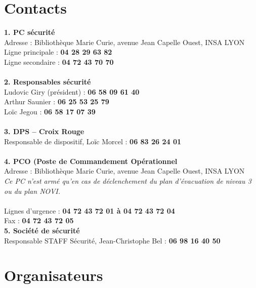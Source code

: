\documentclass[hidelinks, paper=a4, fontsize=13pt]{report}
\begin{document}
\section{Contacts}
\label{refTelPC}

\textbf{1. PC sécurité}\\
Adresse : Bibliothèque Marie Curie, avenue Jean Capelle Ouest, INSA LYON\\
Ligne principale : \textbf{04 28 29 63 82}\\
Ligne secondaire : \textbf{04 72 43 70 70}\\\\

\textbf{2. Responsables sécurité}\\
Ludovic Giry (président) : \textbf{06 58 09 61 40}\\
Arthur Saunier : \textbf{06 25 53 25 79}\\
Loïc Jegou : \textbf{06 58 17 07 39}\\
\\

\textbf{3. DPS – Croix Rouge}\\
Responsable de dispositif, Loïc Morcel : \textbf{06 83 26 24 01}\\\\

\textbf{4. PCO (Poste de Commandement Opérationnel}\\
Adresse : Bibliothèque Marie Curie, avenue Jean Capelle Ouest, INSA LYON\\
\textit{Ce PC n’est armé qu'en cas de déclenchement du plan d'évacuation de niveau 3 ou du plan NOVI.\\\\
}Lignes d’urgence : 			\textbf{04 72 43 72 01   à 	04 72 43 72 04}\\
Fax : 					\textbf{04 72 43 72 05}\\

\textbf{5. Société de sécurité}\\
Responsable STAFF Sécurité, Jean-Christophe Bel : \textbf{06 98 16 40 50}\\
 
\newpage

\section{Organisateurs}
\label{refTelOrgas}

\tabletail{\hline}
\end{document}
